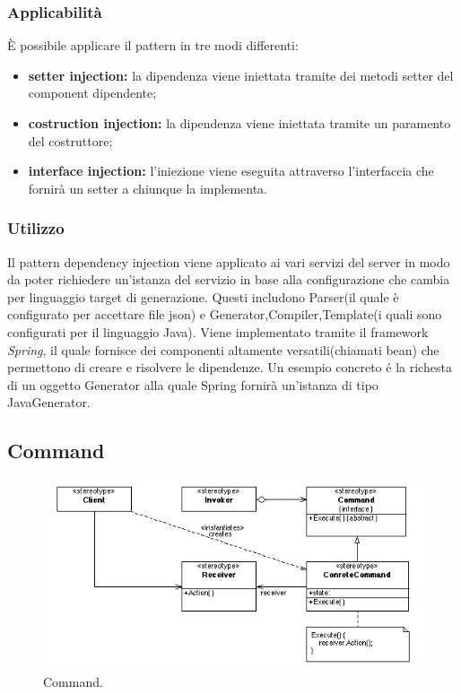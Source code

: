\subsubsection{Applicabilità} È possibile applicare il pattern in tre modi differenti:
\begin{itemize}
	\item \textbf{setter injection:} la dipendenza viene iniettata tramite dei metodi setter del component dipendente;
	\item \textbf{costruction injection:} la dipendenza viene iniettata tramite un paramento del costruttore;
	\item \textbf{interface injection:} l'iniezione viene eseguita attraverso l'interfaccia che fornirà un setter a chiunque la implementa.
\end{itemize}

\subsubsection{Utilizzo}
Il pattern dependency injection viene applicato ai vari servizi del server in modo da poter richiedere un'istanza del servizio in base alla configurazione che cambia per linguaggio target di generazione.
Questi includono Parser(il quale è configurato per accettare file json) e Generator,Compiler,Template(i quali sono configurati per il linguaggio Java).
Viene implementato tramite il framework \emph{Spring}, il quale fornisce dei componenti altamente versatili(chiamati bean) che permettono di creare e risolvere le dipendenze.
Un esempio concreto é la richesta di un oggetto Generator alla quale Spring fornirà un'istanza di tipo JavaGenerator.


\subsection{Command}

\begin{figure}[H] \label{fig:command}
	\includegraphics[scale=0.6]{img/command.png}
	\caption{Command.}
\end{figure}

